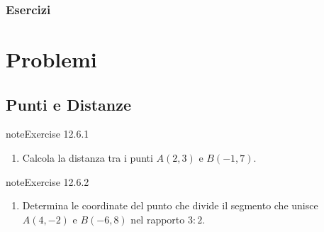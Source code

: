 \documentclass[letterpaper,10pt,italian]{jupyterBook}
\begin{document}
\subsubsection{Esercizi}
\label{\detokenize{ch/analytic_geometry/analytic_geometry_2d/conics-general:esercizi}}
\sphinxstepscope


\section{Problemi}
\label{\detokenize{ch/analytic_geometry/analytic_geometry_2d/problems:problemi}}\label{\detokenize{ch/analytic_geometry/analytic_geometry_2d/problems:geometry-analytic-2d-problems}}\label{\detokenize{ch/analytic_geometry/analytic_geometry_2d/problems::doc}}

\subsection{Punti e Distanze}
\label{\detokenize{ch/analytic_geometry/analytic_geometry_2d/problems:punti-e-distanze}} \label{exercise:ch/analytic_geometry/analytic_geometry_2d/problems-exercise-0}

\begin{sphinxadmonition}{note}{Exercise 12.6.1}


\begin{enumerate}
%
\item {} 
\sphinxAtStartPar
Calcola la distanza tra i punti \( A(2, 3) \) e \( B(-1, 7) \).

\end{enumerate}
\end{sphinxadmonition}
 \label{exercise:ch/analytic_geometry/analytic_geometry_2d/problems-exercise-1}

\begin{sphinxadmonition}{note}{Exercise 12.6.2}


\begin{enumerate}
%
\setcounter{enumi}{1}
\item {} 
\sphinxAtStartPar
Determina le coordinate del punto che divide il segmento che unisce \( A(4, -2) \) e \( B(-6, 8) \) nel rapporto \( 3:2 \).

\end{enumerate}
\end{sphinxadmonition}
 \label{exercise:ch/analytic_geometry/analytic_geometry_2d/problems-exercise-2}
\end{document}
